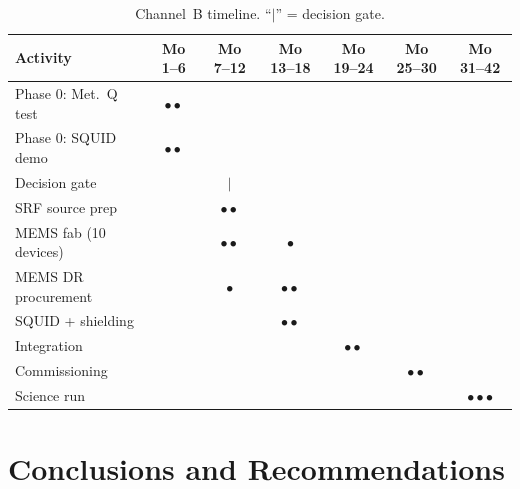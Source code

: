 \documentclass[11pt]{article}
\theoremstyle{definition}
\theoremstyle{remark}
\begin{document}
\begin{table}[H]
\centering
\caption{Channel~B timeline. ``$|$'' = decision gate.}
\label{tab:timeline}
\renewcommand{\arraystretch}{1.2}
\begin{tabular}{@{}lcccccc@{}}
\toprule
\textbf{Activity} & \textbf{Mo 1--6} & \textbf{Mo 7--12} &
  \textbf{Mo 13--18} & \textbf{Mo 19--24} & \textbf{Mo 25--30} &
  \textbf{Mo 31--42} \\
\midrule
Phase 0: Met.\ Q test & $\bullet\bullet$ & & & & & \\
Phase 0: SQUID demo & $\bullet\bullet$ & & & & & \\
Decision gate & & $|$ & & & & \\
SRF source prep & & $\bullet\bullet$ & & & & \\
MEMS fab (10 devices) & & $\bullet\bullet$ & $\bullet$ & & & \\
MEMS DR procurement & & $\bullet$ & $\bullet\bullet$ & & & \\
SQUID + shielding & & & $\bullet\bullet$ & & & \\
Integration & & & & $\bullet\bullet$ & & \\
Commissioning & & & & & $\bullet\bullet$ & \\
Science run & & & & & & $\bullet\bullet\bullet$ \\
\bottomrule
\end{tabular}
\end{table}


\part{Conclusions and Recommendations}
\label{part:conclusions}
\end{document}
